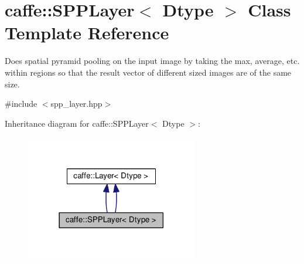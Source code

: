 \hypertarget{classcaffe_1_1_s_p_p_layer}{}\section{caffe\+:\+:S\+P\+P\+Layer$<$ Dtype $>$ Class Template Reference}
\label{classcaffe_1_1_s_p_p_layer}


Does spatial pyramid pooling on the input image by taking the max, average, etc. within regions so that the result vector of different sized images are of the same size.  




{\ttfamily \#include $<$spp\+\_\+layer.\+hpp$>$}



Inheritance diagram for caffe\+:\+:S\+P\+P\+Layer$<$ Dtype $>$\+:
\nopagebreak
\begin{figure}[H]
\begin{center}
\leavevmode
\includegraphics[width=213pt]{classcaffe_1_1_s_p_p_layer__inherit__graph}
\end{center}
\end{figure}
